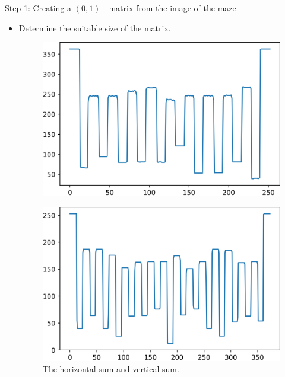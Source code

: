 \documentclass[10pt]{beamer}
\begin{document}
\begin{frame}{Step 1: Creating a $(0, 1)$ - matrix from the image of the maze}
    \begin{itemize}
        \item Determine the suitable size of the matrix.
        \begin{figure}[htb!]
            \centering
            \includegraphics[scale=0.43]{../images/horizontal_sum.png}
            \label{fig:} %
        \end{figure}
        \begin{figure}[htb!]
            \centering
            \includegraphics[scale=0.43]{../images/vertical_sum.png}
            \caption[]{The horizontal sum and vertical sum.}
            \label{fig:} %
        \end{figure}
    \end{itemize}
\end{frame}
\end{document}
